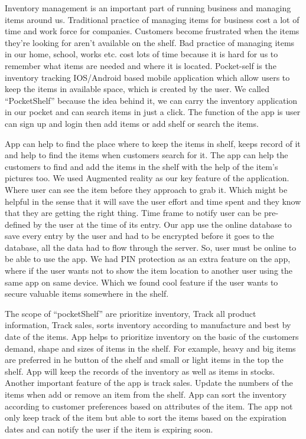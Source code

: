 
 \item Inventory management is an important part of running business and managing items around us. Traditional practice of managing items for business cost a lot of time and work force for companies. Customers become frustrated when the items they’re looking for aren’t available on the shelf. Bad practice of managing items in our home, school, works etc.  cost lots of time because it is hard for us to remember what items are needed and where it is located. Pocket-self is the inventory tracking IOS/Android based mobile application which allow users to keep the items in available space, which is created by the user. We called “PocketShelf” because the idea behind it, we can carry the inventory application in our pocket and can search items in just a click. The function of the app is user can sign up and login then add items or add shelf or search the items.
 
\item\item App can help to find the place where to keep the items in shelf, keeps record of it and help to find the items when customers search for it. The app can help the customers to find and add the items in the shelf with the help of the item’s pictures too. We used Augmented reality as our key feature of the application. Where user can see the item before they approach to grab it. Which might be helpful in the sense that it will save the user effort and time spent and they know that they are getting the right thing. Time frame to notify user can be pre- defined by the user at the time of its entry. Our app use the online database to save every entry by the user and had to be encrypted before it goes to the database, all the data had to flow through the server. So, user must be online to be able to use the app. We had PIN protection as an extra feature on the app, where if the user wants not to show the item location to another user using the same app on same device. Which we found cool feature if the user wants to secure valuable items somewhere in the shelf.

\item\item The scope of “pocketShelf” are prioritize inventory, Track all product information, Track sales, sorts inventory according to manufacture and best by date of the items. App helps to prioritize inventory on the basic of the customers demand, shape and sizes of items in the shelf. For example, heavy and big items are preferred in he button of the shelf and small or light items in the top the shelf. App will keep the records of the inventory as well as items in stocks. Another important feature of the app is track sales. Update the numbers of the items when add or remove an item from the shelf. App can sort the inventory according to customer preferences based on attributes of the item. The app not only keep track of the item but able to sort the items based on the expiration dates and can notify the user if the item is expiring soon.





